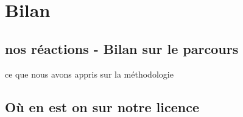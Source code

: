 \chapter{Bilan}


\section{nos réactions - Bilan sur le parcours}
ce que nous avons appris sur la méthodologie


\section{Où en est on sur notre licence}


